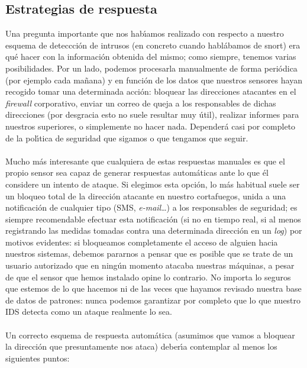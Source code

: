 \subsection{Estrategias de respuesta}
Una pregunta importante que nos hab\'{\i}amos realizado con respecto a nuestro 
esquema de deteccci\'on de intrusos (en concreto cuando habl\'abamos de {\sc 
snort}) era qu\'e hacer con la informaci\'on obtenida del mismo; como 
siempre, tenemos varias posibilidades. Por un lado, podemos procesarla 
manualmente de forma peri\'odica (por ejemplo cada ma\~nana) y en funci\'on de 
los datos que nuestros sensores hayan recogido tomar una determinada acci\'on:
bloquear las direcciones atacantes en el {\it firewall} corporativo, enviar un
correo de queja a los responsables de dichas direcciones (por desgracia esto no 
suele resultar muy \'util), realizar informes para nuestros superiores, o 
simplemente no hacer nada. Depender\'a casi por completo de la pol\'{\i}tica de 
seguridad que sigamos o que tengamos que seguir.\\
\\Mucho m\'as interesante que cualquiera de estas respuestas manuales es que el 
propio 
sensor sea capaz de generar respuestas autom\'aticas ante lo que \'el considere
un intento de ataque. Si elegimos esta opci\'on, lo m\'as habitual suele ser
un bloqueo total de la direcci\'on atacante en nuestro cortafuegos, unida a una
notificaci\'on de cualquier tipo (SMS, {\it e-mail}\ldots) a los responsables
de seguridad; es siempre recomendable efectuar esta notificaci\'on (si no en
tiempo real, si al menos registrando las medidas tomadas contra una determinada
direcci\'on en un {\it log}) por motivos evidentes: si bloqueamos completamente 
el acceso de alguien hacia nuestros sistemas, debemos pararnos a pensar que
es posible que se trate de un usuario autorizado que en ning\'un momento 
atacaba nuestras m\'aquinas, a pesar de que el sensor que hemos instalado opine
lo contrario. No importa lo seguros que estemos de lo que hacemos ni de las
veces que hayamos revisado nuestra base de datos de patrones: nunca podemos
garantizar por completo que lo que nuestro IDS detecta como un ataque realmente
lo sea.\\
\\Un correcto esquema de respuesta autom\'atica (asumimos que vamos a bloquear
la direcci\'on que presuntamente nos ataca) deber\'{\i}a contemplar al menos
los siguientes puntos:
